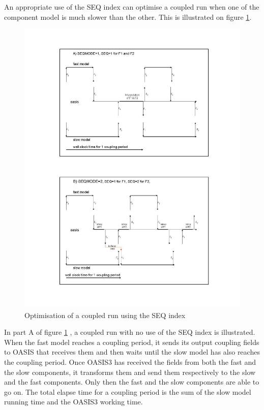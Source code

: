 An appropriate use of the SEQ index can optimise a coupled run when 
one of the component model is much slower than the other. This is illustrated 
on figure \ref{fig:seq_optim}.
 \begin{figure}
\includegraphics[scale=.6]{figures/fig_seq_optim} 
\caption{Optimisation of a coupled run using the SEQ index}
\label{fig:seq_optim}
\end{figure}

In part A of figure \ref{fig:seq_optim} , a coupled run with no use of the SEQ
index is illustrated.  When the fast model reaches a coupling period,
it sends its output coupling fields to OASIS that receives them and
then waits until the slow model has also reaches the coupling period.
Once OASIS3 has received the fields from both the fast and the slow
components, it transforms them and send them respectively to the slow
and the fast components. Only then the fast and the slow components
are able to go on. The total elapse time for a coupling period is the
sum of the slow model running time and the OASIS3 working time.  

